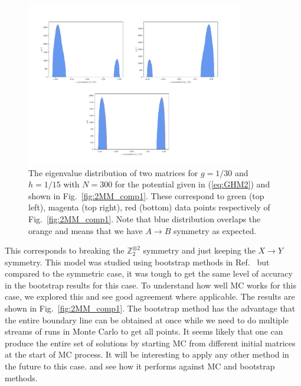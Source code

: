 \documentclass[letter,11pt]{article}
\begin{document}
\begin{figure}[htbp] 
	\centering 
	\includegraphics[width=0.85\textwidth]{figs/all_symb_ev.pdf}
	\caption{\label{fig:2MM_evd}The eigenvalue distribution of two matrices for $g=1/30$ and $h=1/15$ 
	with $N=300$ for the potential given in (\ref{eq:GHM2}) and shown in Fig.~\ref{fig:2MM_comp1}.
	These correspond to green (top left), magenta (top right), red (bottom) data points respectively of Fig.~\ref{fig:2MM_comp1}.
	Note that blue distribution overlaps the orange and means that we have $A \to B$ symmetry as expected.}
\end{figure}
This corresponds to breaking the $\mathbb{Z}_{2}^{\otimes 2}$ symmetry and just keeping the $X \to Y$ symmetry. This model was studied using bootstrap methods in 
Ref.~\cite{Kazakov:2021lel} but compared to the symmetric case, it was tough to get the same level of accuracy in the bootstrap results for this case. To understand how well MC works for this case, we explored this and see good agreement where applicable. The results are shown in Fig.~\ref{fig:2MM_comp1}. The bootstrap method has the advantage that the entire boundary line can be obtained at once while we need to do multiple streams of runs in Monte Carlo to get all points. It seems likely that one can produce the entire set of solutions by starting MC from different initial matrices at the start of MC process.  It will be interesting to apply any other method in the future to this case.
and see how it performs against MC and bootstrap methods.  
\end{document}

